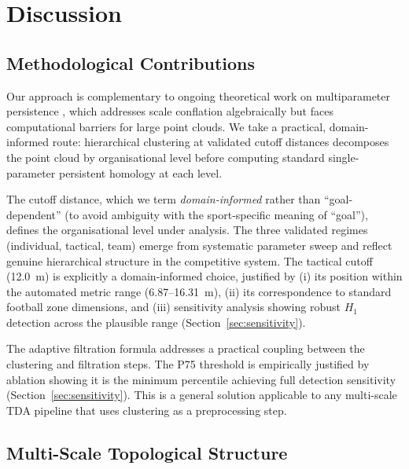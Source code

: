 \section{Discussion}
\label{sec:discussion}

\subsection{Methodological Contributions}

Our approach is complementary to ongoing theoretical work on multiparameter persistence \citep{BotnanLesnick2022}, which addresses scale conflation algebraically but faces computational barriers for large point clouds. We take a practical, domain-informed route: hierarchical clustering at validated cutoff distances decomposes the point cloud by organisational level before computing standard single-parameter persistent homology at each level.

The cutoff distance, which we term \emph{domain-informed} rather than ``goal-dependent'' (to avoid ambiguity with the sport-specific meaning of ``goal''), defines the organisational level under analysis. The three validated regimes (individual, tactical, team) emerge from systematic parameter sweep and reflect genuine hierarchical structure in the competitive system. The tactical cutoff (12.0~m) is explicitly a domain-informed choice, justified by (i) its position within the automated metric range (6.87--16.31~m), (ii) its correspondence to standard football zone dimensions, and (iii) sensitivity analysis showing robust \(H_1\) detection across the plausible range (Section~\ref{sec:sensitivity}).

The adaptive filtration formula addresses a practical coupling between the clustering and filtration steps. The P75 threshold is empirically justified by ablation showing it is the minimum percentile achieving full detection sensitivity (Section~\ref{sec:sensitivity}). This is a general solution applicable to any multi-scale TDA pipeline that uses clustering as a preprocessing step.

\subsection{Multi-Scale Topological Structure}
\label{sec:scale_complementarity_discussion}

